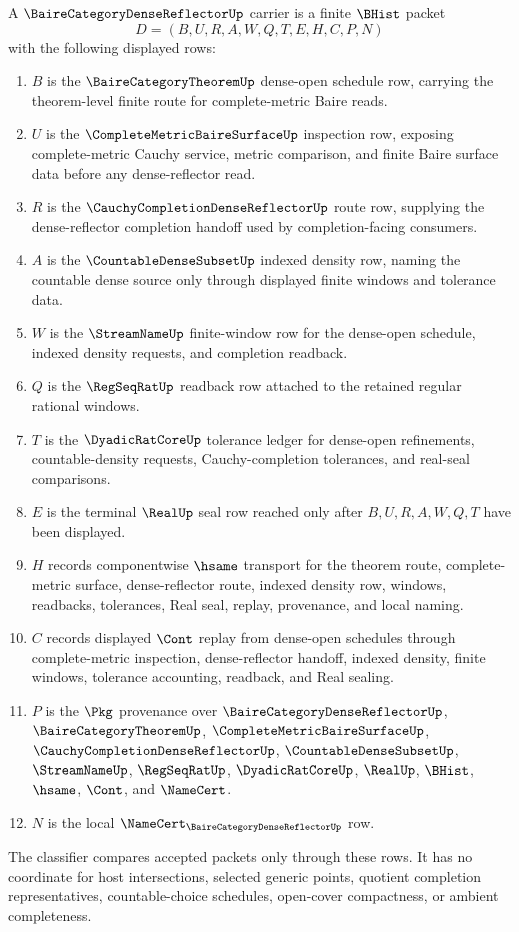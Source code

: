 \begin{definition}
\label{def:baire-category-dense-reflector-carrier}
A $\BaireCategoryDenseReflectorUp$ carrier is a finite $\BHist$ packet
$$
D=(B,U,R,A,W,Q,T,E,H,C,P,N)
$$
with the following displayed rows:
\begin{enumerate}
\item $B$ is the $\BaireCategoryTheoremUp$ dense-open schedule row, carrying the theorem-level finite route for complete-metric Baire reads.
\item $U$ is the $\CompleteMetricBaireSurfaceUp$ inspection row, exposing complete-metric Cauchy service, metric comparison, and finite Baire surface data before any dense-reflector read.
\item $R$ is the $\CauchyCompletionDenseReflectorUp$ route row, supplying the dense-reflector completion handoff used by completion-facing consumers.
\item $A$ is the $\CountableDenseSubsetUp$ indexed density row, naming the countable dense source only through displayed finite windows and tolerance data.
\item $W$ is the $\StreamNameUp$ finite-window row for the dense-open schedule, indexed density requests, and completion readback.
\item $Q$ is the $\RegSeqRatUp$ readback row attached to the retained regular rational windows.
\item $T$ is the $\DyadicRatCoreUp$ tolerance ledger for dense-open refinements, countable-density requests, Cauchy-completion tolerances, and real-seal comparisons.
\item $E$ is the terminal $\RealUp$ seal row reached only after $B,U,R,A,W,Q,T$ have been displayed.
\item $H$ records componentwise $\hsame$ transport for the theorem route, complete-metric surface, dense-reflector route, indexed density row, windows, readbacks, tolerances, Real seal, replay, provenance, and local naming.
\item $C$ records displayed $\Cont$ replay from dense-open schedules through complete-metric inspection, dense-reflector handoff, indexed density, finite windows, tolerance accounting, readback, and Real sealing.
\item $P$ is the $\Pkg$ provenance over $\BaireCategoryDenseReflectorUp$, $\BaireCategoryTheoremUp$, $\CompleteMetricBaireSurfaceUp$, $\CauchyCompletionDenseReflectorUp$, $\CountableDenseSubsetUp$, $\StreamNameUp$, $\RegSeqRatUp$, $\DyadicRatCoreUp$, $\RealUp$, $\BHist$, $\hsame$, $\Cont$, and $\NameCert$.
\item $N$ is the local $\NameCert_{\BaireCategoryDenseReflectorUp}$ row.
\end{enumerate}
The classifier compares accepted packets only through these rows. It has no coordinate for host intersections, selected generic points, quotient completion representatives, countable-choice schedules, open-cover compactness, or ambient completeness.
\end{definition}

